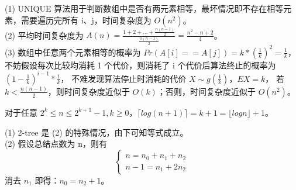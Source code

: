 \documentclass[12pt, a4paper, oneside]{ctexart}
\begin{document}
\begin{solution}[1.10]
(1) UNIQUE 算法用于判断数组中是否有两元素相等，最坏情况即不存在相等元素，需要遍历完所有 i、j，时间复杂度为 $O(n^2)$。
\\(2) 平均时间复杂度为 $A(n) = \frac{1 + 2 + \dots + \frac{n(n - 1)}{2}}{\frac{n(n - 1)}{2}} = \frac{n^2 - n + 2}{4}$。
\\(3) 数组中任意两个元素相等的概率为 $Pr(A[i] == A[j]) = k * (\frac{1}{k})^2 = \frac{1}{k}$，
不妨假设每次比较均消耗 1 个代价，则消耗了 i 个代价后算法终止的概率为 $(1 - \frac{1}{k})^{i - 1} * \frac{1}{k}$，
不难发现算法停止时消耗的代价 $X \sim g(\frac{1}{k})$，$EX = k$，
若 $k < \frac{n(n - 1)}{2}$，则时间复杂度近似于 $O(k)$；否则，时间复杂度近似于 $O(n^2)$。
\end{solution}

\begin{solution}[2.2]
对于任意 $2^k \leq n \leq 2^{k + 1} - 1, k \geq 0$，$\lceil log(n + 1) \rceil = k + 1 = \lfloor logn \rfloor + 1$。
\end{solution}

\begin{solution}[2.5]
(1) 2-tree 是 (2) 的特殊情况，由下可知等式成立。
\\(2) 假设总结点数为 n，则有
\[
\begin{cases}
    n = n_0 + n_1 + n_2 \\
    n - 1 = n_1 + 2n_2
\end{cases}
\]
消去 $n_1$ 即得：$n_0 = n_2 + 1$。
\end{solution}
\end{document}
